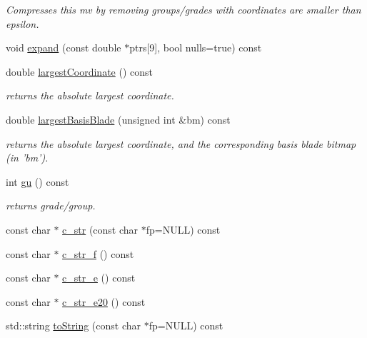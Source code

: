 \begin{DoxyCompactItemize}
\begin{DoxyCompactList}\small\item\em Compresses this mv by removing groups/grades with coordinates are smaller than epsilon. \end{DoxyCompactList}\item 
void \hyperlink{classe3ga_1_1mv_a54c74d665ea59095568861cfdef7d60f}{expand} (const double $\ast$ptrs\mbox{[}9\mbox{]}, bool nulls=true) const 
\item 
\hypertarget{classe3ga_1_1mv_ab09e11b75eb6189929862af9f205b757}{double \hyperlink{classe3ga_1_1mv_ab09e11b75eb6189929862af9f205b757}{largest\-Coordinate} () const }\label{classe3ga_1_1mv_ab09e11b75eb6189929862af9f205b757}

\begin{DoxyCompactList}\small\item\em returns the absolute largest coordinate. \end{DoxyCompactList}\item 
\hypertarget{classe3ga_1_1mv_a651616801f47374acef4443734053c81}{double \hyperlink{classe3ga_1_1mv_a651616801f47374acef4443734053c81}{largest\-Basis\-Blade} (unsigned int \&bm) const }\label{classe3ga_1_1mv_a651616801f47374acef4443734053c81}

\begin{DoxyCompactList}\small\item\em returns the absolute largest coordinate, and the corresponding basis blade bitmap (in 'bm'). \end{DoxyCompactList}\item 
\hypertarget{classe3ga_1_1mv_a66b360fa8609ea9243f1c92b33d8e102}{int \hyperlink{classe3ga_1_1mv_a66b360fa8609ea9243f1c92b33d8e102}{gu} () const }\label{classe3ga_1_1mv_a66b360fa8609ea9243f1c92b33d8e102}

\begin{DoxyCompactList}\small\item\em returns grade/group. \end{DoxyCompactList}\item 
const char $\ast$ \hyperlink{classe3ga_1_1mv_adaf13b8b06db4ee63ea1d985064cb844}{c\-\_\-str} (const char $\ast$fp=N\-U\-L\-L) const 
\item 
const char $\ast$ \hyperlink{classe3ga_1_1mv_a54e34e24e58fc6e34b5398da472cbefc}{c\-\_\-str\-\_\-f} () const 
\item 
const char $\ast$ \hyperlink{classe3ga_1_1mv_af4a9489496f35122be713f4c41f5b93a}{c\-\_\-str\-\_\-e} () const 
\item 
const char $\ast$ \hyperlink{classe3ga_1_1mv_a64cea1ace1d4ab4f1864693ab9d908e3}{c\-\_\-str\-\_\-e20} () const 
\item 
\hypertarget{classe3ga_1_1mv_afd0ddcbcfaa0682885a208af86157194}{std\-::string \hyperlink{classe3ga_1_1mv_afd0ddcbcfaa0682885a208af86157194}{to\-String} (const char $\ast$fp=N\-U\-L\-L) const }\label{classe3ga_1_1mv_afd0ddcbcfaa0682885a208af86157194}


\end{DoxyCompactItemize}
